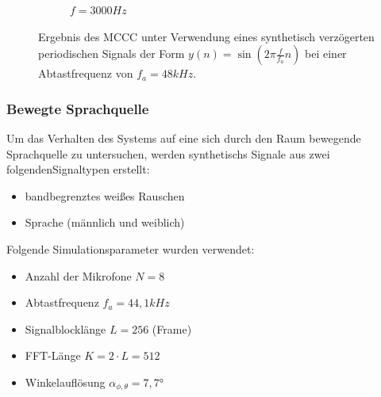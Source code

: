 \begin{figure}
\begin{subfigure}[b]{0.48\textwidth}
                \caption{$f=3000Hz$}
                \label{fig:Sim_sine_f_3000_Phi_45_Theta_120_dB_SNR_100dB}
        \end{subfigure}
        \caption{Ergebnis des MCCC unter Verwendung eines synthetisch verzögerten periodischen Signals der Form $y(n) = \sin{\left( 2 \pi \frac{f}{f_a} n \right)}$ bei einer Abtastfrequenz von $f_a=48kHz$.}
        \label{fig:Sim_sine_spartial_aliasing}
\end{figure}
    


\subsubsection{Bewegte Sprachquelle} 
Um das Verhalten des Systems auf eine sich durch den Raum bewegende Sprachquelle zu untersuchen, werden synthetischs Signale aus zwei folgendenSignaltypen erstellt:

\begin{itemize}
    \item bandbegrenztes weißes Rauschen
    \item Sprache (männlich und weiblich)
\end{itemize}

Folgende Simulationsparameter wurden verwendet:

\begin{itemize}
    \item Anzahl der Mikrofone $N=8$
    \item Abtastfrequenz $f_a = 44,1kHz$
    \item Signalblocklänge $L=256$ (Frame)
    \item FFT-Länge $K = 2 \cdot L = 512$
    \item Winkelauflösung $\alpha_{\phi, \theta} = 7,7°$ 
\end{itemize}

